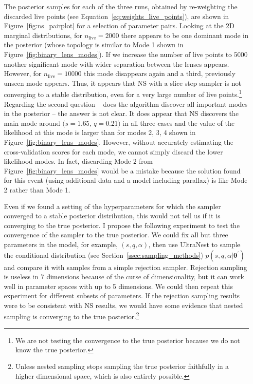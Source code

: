 \documentclass[12pt,dvipsnames]{report}
\newcommand{\ssf}[1]{\textsf{#1}}
\renewcommand{\vec}[1]{\boldsymbol{\mathbf{#1}}}
\begin{document}
The posterior samples for each of the three runs, obtained by re-weighting the discarded
live points (see Equation~\ref{eq:weights_live_points}), are shown in 
Figure~\ref{fig:ns_pairplot} for a selection of parameter pairs. Looking at the 2D marginal 
distributions, for $n_\mathrm{live}=2000$ there appears to be one dominant mode in the 
posterior (whose topology is similar to Mode 1 shown in Figure~\ref{fig:binary_lens_modes}).
If we increase the number of live points to 5000 another significant mode with wider separation
between the lenses appears. However, for $n_\mathrm{live}=10000$ this mode disappears again 
and a third, previously unseen mode appears. Thus, it appears that NS with a slice step sampler 
is not converging to a stable distribution, even for a very large number of live points.\footnote{We are not testing the convergence 
to the true posterior because we do not know the true posterior.}
Regarding the second question -- does the algorithm discover all important modes in the
posterior -- the answer is not clear. It does appear that NS discovers the main mode around 
$(s=1.65$, $q=0.21)$ in all three cases and the value of the likelihood 
at this mode is larger than for modes 2, 3, 4  shown in Figure~\ref{fig:binary_lens_modes}.
However, without accurately estimating the cross-validation scores for each mode, we 
cannot simply discard the lower likelihood modes. In fact, discarding Mode 2 from 
Figure~\ref{fig:binary_lens_modes} would be a mistake because the solution 
 \citet{2018ApJ...867..136H} found for this event (using additional data and a model 
 including parallax) is like Mode 2 rather than Mode 1.


Even if we found a setting of the hyperparameters for which the sampler converged to a 
stable posterior distribution, this would not tell us if it is converging to the true posterior. 
I propose the following experiment to test the convergence of the sampler to the true posterior.
We could fix all but three parameters in the model, for example, $(s, q, \alpha)$, 
then use \ssf{UltraNest} to sample the conditional distribution 
(see Section~\ref{ssec:sampling_methods}) 
$p(s,q,\alpha|\vec\theta^\prime)$ and compare it with samples from a simple rejection 
sampler. Rejection sampling is useless in 7 dimensions because of the curse of dimensionality,
but it can work well in parameter spaces with up to 5 dimensions. We could then repeat this
experiment for different subsets of parameters. If the rejection sampling results were to be  
consistent with NS results, we would have some evidence that nested sampling 
is converging to the true posterior.\footnote{Unless nested sampling stops sampling the true posterior
faithfully in a higher dimensional space, which is also entirely possible.}
\end{document}
